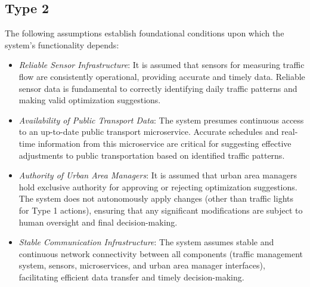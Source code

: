 \documentclass[a4paper,12pt]{article}
\begin{document}
\subsection*{Type 2}
The following assumptions establish foundational conditions upon which the system's functionality depends:
\begin{itemize}
    \item \textit{Reliable Sensor Infrastructure}: It is assumed that sensors for measuring traffic flow are consistently operational, providing accurate and timely data. Reliable sensor data is fundamental to correctly identifying daily traffic patterns and making valid optimization suggestions.
    \item \textit{Availability of Public Transport Data}: The system presumes continuous access to an up-to-date public transport microservice. Accurate schedules and real-time information from this microservice are critical for suggesting effective adjustments to public transportation based on identified traffic patterns.
    \item \textit{Authority of Urban Area Managers}: It is assumed that urban area managers hold exclusive authority for approving or rejecting optimization suggestions. The system does not autonomously apply changes (other than traffic lights for Type 1 actions), ensuring that any significant modifications are subject to human oversight and final decision-making.
    \item \textit{Stable Communication Infrastructure}: The system assumes stable and continuous network connectivity between all components (traffic management system, sensors, microservices, and urban area manager interfaces), facilitating efficient data transfer and timely decision-making.
\end{itemize}

\newpage
\end{document}
